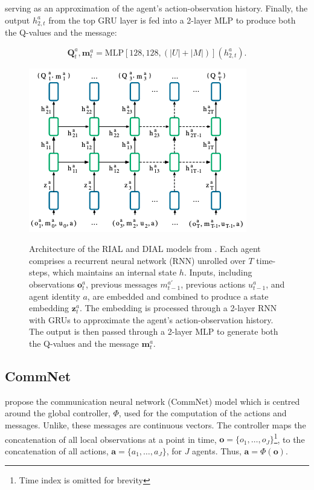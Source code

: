 \documentclass{article}
\begin{document}
serving as an approximation of the agent’s action-observation history. Finally, the output \( h_{2, t}^a \) from the top GRU layer is fed into a 2-layer MLP to produce both the Q-values and the message:

$$
\mathbf{Q}_t^a, \mathbf{m}_t^a = \text{MLP}[128, 128, (|U| + |M|)](h_{2, t}^a).
$$


\begin{figure}
	\centering
	\includegraphics[scale=0.7]{images/rial_dial_nn.png}\
	\caption{Architecture of the RIAL and DIAL models from \citet{foerster2016learning}. Each agent comprises a recurrent neural network (RNN) unrolled over \( T \) time-steps, which maintains an internal state \( h \). Inputs, including observations \( \mathbf{o}_t^a \), previous messages \( m_{t-1}^{a'} \), previous actions \( u_{t-1}^a \), and agent identity \( a \), are embedded and combined to produce a state embedding \( \mathbf{z}_t^a \). The embedding is processed through a 2-layer RNN with GRUs to approximate the agent’s action-observation history. The output is then passed through a 2-layer MLP to generate both the Q-values and the message \( \mathbf{m}_t^a \).}
	\label{fig:rial_dial_nn}
\end{figure}

\subsection{CommNet}

\citet{sukhbaatar2016commnet} propose the communication neural network (CommNet) model which is centred around the global controller, $\Phi$, used for the computation of the actions and messages. Unlike, \citet{foerster2016learning} these messages are continuous vectors. The controller maps the concatenation of all local observations at a point in time, $\mathbf{o} = \{ o_1, \hdots, o_J \}$\footnote{Time index is omitted for brevity}, to the concatenation of all actions, $\mathbf{a} = \{ a_1, \hdots, a_J \}$, for $J$ agents. Thus, $\mathbf{a} = \Phi(\mathbf{o})$. 
\end{document}
